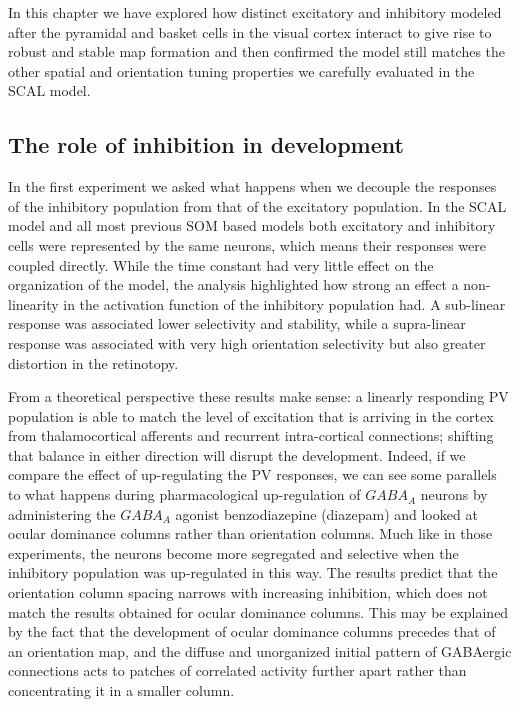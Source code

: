 In this chapter we have explored how distinct excitatory and
inhibitory modeled after the pyramidal and basket cells in the visual
cortex interact to give rise to robust and stable map formation and
then confirmed the model still matches the other spatial and
orientation tuning properties we carefully evaluated in the SCAL
model.

\subsection{The role of inhibition in development}

In the first experiment we asked what happens when we decouple the
responses of the inhibitory population from that of the excitatory
population. In the SCAL model and all most previous SOM based models
both excitatory and inhibitory cells were represented by the same
neurons, which means their responses were coupled directly. While the
time constant had very little effect on the organization of the model,
the analysis highlighted how strong an effect a non-linearity in the
activation function of the inhibitory population had. A sub-linear
response was associated lower selectivity and stability, while a
supra-linear response was associated with very high orientation
selectivity but also greater distortion in the retinotopy.

From a theoretical perspective these results make sense: a linearly
responding PV population is able to match the level of excitation that
is arriving in the cortex from thalamocortical afferents and recurrent
intra-cortical connections; shifting that balance in either direction
will disrupt the development. Indeed, if we compare the effect of
up-regulating the PV responses, we can see some parallels to what
happens during pharmacological up-regulation of $GABA_A$ neurons by
administering the $GABA_A$ agonist benzodiazepine (diazepam)
\citep{Fagiolini2004,Hensch2004} and looked at ocular dominance
columns rather than orientation columns. Much like in those
experiments, the neurons become more segregated and selective when the
inhibitory population was up-regulated in this way. The results
predict that the orientation column spacing narrows with increasing
inhibition, which does not match the results obtained for ocular
dominance columns. This may be explained by the fact that the
development of ocular dominance columns precedes that of an
orientation map, and the diffuse and unorganized initial pattern of
GABAergic connections acts to patches of correlated activity further
apart rather than concentrating it in a smaller column.

